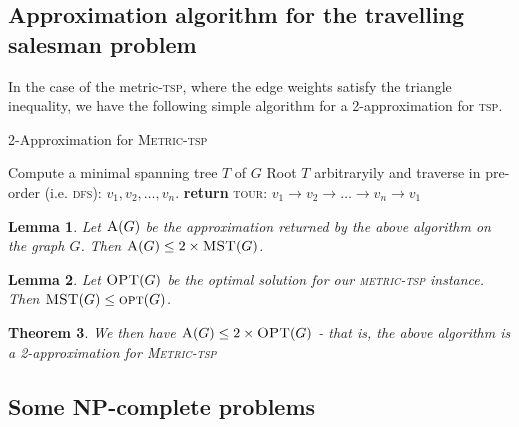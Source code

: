 \documentclass[10pt, oneside, reqno]{amsart}
\theoremstyle{plain}%
\newtheorem{thm}{Theorem}[section]
\newtheorem{lem}[thm]{Lemma}
\theoremstyle{definition}
\theoremstyle{remark}
\begin{document}
\subsection{Approximation algorithm for the travelling salesman problem} %
\label{sub:approximation_algorithm_for_the_travelling_salesman_problem}
In the case of the metric-\textsc{tsp}, where the edge weights satisfy the triangle inequality, we have the following simple algorithm for a 2-approximation for \textsc{tsp}.  

 
\begin{algorithm}[H]
	\label{alg:dynamic_rising_trend}
	\caption{2-Approximation for \textsc{Metric-tsp}}
	\begin{algorithmic}[1]
		\State Compute a minimal spanning tree $T$ of $G$
		\State Root $T$ arbitraryily and traverse in pre-order (i.e. \textsc{dfs}): $v_1, v_2, \dots, v_n$.
		\State \textbf{return} \textsc{tour: $v_1 \rightarrow v_2 \rightarrow \dots \rightarrow v_n \rightarrow v_1$}
	\EndProcedure
	\end{algorithmic}
\end{algorithm}

\begin{lem}
	Let $\textsc{A}(G)$ be the approximation returned by the above algorithm on the graph $G$.  Then $\textsc{A}(G) \leq  2 \times \textsc{MST}(G)$.
\end{lem}

\begin{lem}
	Let $\textsc{OPT}(G)$ be the optimal solution for our \textsc{metric-tsp} instance.  Then  $\textsc{MST}(G) \leq \textsc{opt}(G)$. 
\end{lem}
\begin{thm}
	We then have $\textsc{A}(G) \leq 2 \times \textsc{OPT}(G)$ - that is, the above algorithm is a 2-approximation for \textsc{Metric-tsp}
\end{thm}





\subsection{Some NP-complete problems}
\end{document}
